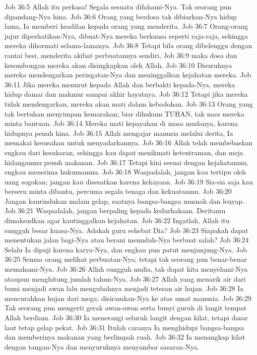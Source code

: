 Job 36:5  Allah itu perkasa! Segala sesuatu difahami-Nya. Tak seorang pun dipandang-Nya hina.
Job 36:6  Orang yang berdosa tak dibiarkan-Nya hidup lama, Ia memberi keadilan kepada orang yang menderita.
Job 36:7  Orang-orang jujur diperhatikan-Nya, dibuat-Nya mereka berkuasa seperti raja-raja, sehingga mereka dihormati selama-lamanya.
Job 36:8  Tetapi bila orang dibelenggu dengan rantai besi, menderita akibat perbuatannya sendiri,
Job 36:9  maka dosa dan kesombongan mereka akan disingkapkan oleh Allah.
Job 36:10  Disuruhnya mereka mendengarkan peringatan-Nya dan meninggalkan kejahatan mereka.
Job 36:11  Jika mereka menurut kepada Allah dan berbakti kepada-Nya, mereka hidup damai dan makmur sampai akhir hayatnya.
Job 36:12  Tetapi jika mereka tidak mendengarkan, mereka akan mati dalam kebodohan.
Job 36:13  Orang yang tak bertuhan menyimpan kemarahan; biar dihukum TUHAN, tak mau mereka minta bantuan.
Job 36:14  Mereka mati kepayahan di masa mudanya, karena hidupnya penuh hina.
Job 36:15  Allah mengajar manusia melalui derita, Ia memakai kesusahan untuk menyadarkannya.
Job 36:16  Allah telah membebaskan engkau dari kesukaran, sehingga kau dapat menikmati ketentraman, dan meja hidanganmu penuh makanan.
Job 36:17  Tetapi kini sesuai dengan kejahatanmu, engkau menerima hukumanmu.
Job 36:18  Waspadalah, jangan kau tertipu oleh uang sogokan; jangan kau disesatkan karena kekayaan.
Job 36:19  Sia-sia saja kau berseru minta dibantu, percuma segala tenaga dan kekuatanmu.
Job 36:20  Jangan kaurindukan malam gelap, saatnya bangsa-bangsa musnah dan lenyap.
Job 36:21  Waspadalah, jangan berpaling kepada kedurhakaan. Deritamu dimaksudkan agar kautinggalkan kejahatan.
Job 36:22  Ingatlah, Allah itu sungguh besar kuasa-Nya. Adakah guru sehebat Dia?
Job 36:23  Siapakah dapat menentukan jalan bagi-Nya atau berani menuduh-Nya berbuat salah?
Job 36:24  Selalu Ia dipuji karena karya-Nya, dan engkau pun patut menjunjung-Nya.
Job 36:25  Semua orang melihat perbuatan-Nya; tetapi tak seorang pun benar-benar memahami-Nya.
Job 36:26  Allah sungguh mulia, tak dapat kita menyelami-Nya ataupun menghitung jumlah tahun-Nya.
Job 36:27  Allah yang menarik air dari bumi menjadi awan lalu mengubahnya menjadi tetesan air hujan.
Job 36:28  Ia mencurahkan hujan dari mega; disiramkan-Nya ke atas umat manusia.
Job 36:29  Tak seorang pun mengerti gerak awan-awan serta bunyi guruh di langit tempat Allah berdiam.
Job 36:30  Ia menerangi seluruh langit dengan kilat, tetapi dasar laut tetap gelap pekat.
Job 36:31  Itulah caranya Ia menghidupi bangsa-bangsa dan memberinya makanan yang berlimpah ruah.
Job 36:32  Ia menangkap kilat dengan tangan-Nya dan menyuruhnya menyambar sasaran-Nya.
